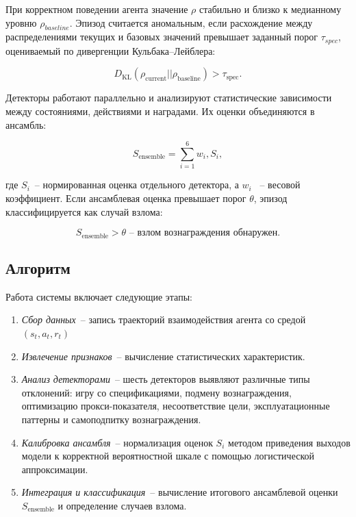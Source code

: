При корректном поведении агента значение $\rho$ стабильно и близко к медианному уровню $\rho_{baseline}$. Эпизод считается аномальным, если расхождение между распределениями текущих и базовых значений превышает заданный порог $\tau_{spec}$, оцениваемый по дивергенции Кульбака–Лейблера:

\begin{equation}
D_{\mathrm{KL}}(\rho_{\text{current}} || \rho_{\text{baseline}}) > \tau_{\text{spec}}.
\end{equation}

Детекторы работают параллельно и анализируют статистические зависимости между состояниями, действиями и наградами. Их оценки объединяются в ансамбль:

\begin{equation}
S_{\mathrm{ensemble}} = \sum_{i=1}^{6} w_i , S_i,
\end{equation}

где $S_i$~-- нормированная оценка отдельного детектора, а $w_i$ ~-- весовой коэффициент. Если ансамблевая оценка превышает порог $\theta$, эпизод классифицируется как случай взлома:

\begin{equation}
S_{\mathrm{ensemble}} > \theta \text{~-- взлом вознаграждения обнаружен.}
\end{equation}


\subsection{Алгоритм}

Работа системы включает следующие этапы:

\begin{enumerate}
    \item \emph{Сбор данных}~-- запись траекторий взаимодействия агента со средой $(s_t, a_t, r_t)$
    \item \emph{Извлечение признаков}~-- вычисление статистических характеристик.
    \item \emph{Анализ детекторами}~-- шесть детекторов выявляют различные типы отклонений: игру со спецификациями, подмену вознаграждения, оптимизацию прокси-показателя, несоответствие цели, эксплуатационные паттерны и самоподпитку вознаграждения.
    \item \emph{Калибровка ансамбля}~-- нормализация оценок $S_i$ методом приведения выходов модели к корректной вероятностной шкале с помощью логистической аппроксимации.
    \item \emph{Интеграция и классификация}~-- вычисление итогового ансамблевой оценки $S_{\mathrm{ensemble}}$ и определение случаев взлома.
\end{enumerate}

